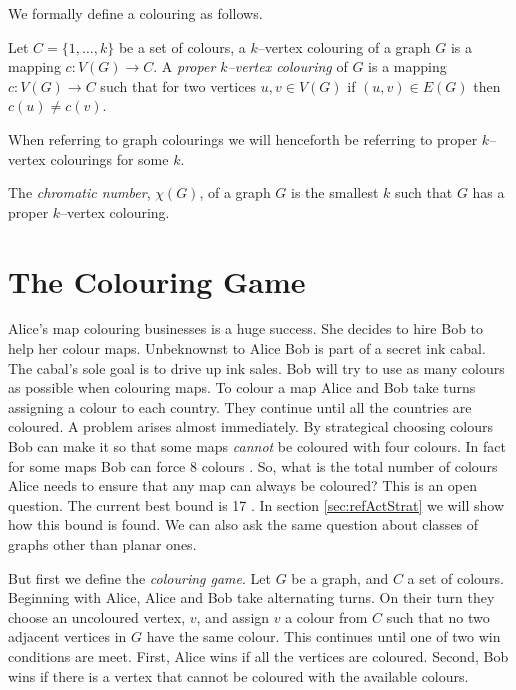 We formally define a colouring as follows.
\begin{definition}
Let $C=\{1,\dots,k\}$ be a set of colours, a $k$--vertex colouring of a graph $G$ is a mapping $c\colon V(G) \to C$. A \textit{proper $k$--vertex colouring} of $G$ is a mapping $c\colon V(G) \to C$ such that for two vertices $u,v\in V(G)$ if $(u,v)\in E(G)$ then $c(u)\neq c(v)$. 
\end{definition}
When referring to graph colourings we will henceforth be referring to proper $k$--vertex colourings for some $k$. 
\begin{definition}
The \textit{chromatic number}, $\chi(G)$, of a graph $G$ is the smallest $k$ such that $G$ has a proper $k$--vertex colouring.
\end{definition} 

\section{The Colouring Game} \label{sec:colouring_game}
Alice's map colouring businesses is a huge success. She decides to hire Bob to help her colour maps. Unbeknownst to Alice Bob is part of a secret ink cabal. The cabal's sole goal is to drive up ink sales. Bob will try to use as many colours as possible when colouring maps. To colour a map Alice and Bob take turns assigning a colour to each country. They continue until all the countries are coloured. A problem arises almost immediately. By strategical choosing colours Bob can make it so that some maps \textit{cannot} be coloured with four colours. In fact for some maps Bob can force 8 colours \cite{kierstead1994planar}. So, what is the total number of colours Alice needs to ensure that any map can always be coloured? This is an open question. The current best bound is 17 \cite{Zhu2008}. In section \ref{sec:refActStrat} we will show how this bound is found. We can also ask the same question about classes of graphs other than planar ones. 

But first we define the \textit{colouring game}. Let $G$ be a graph, and $C$ a set of colours. Beginning with Alice, Alice and Bob take alternating turns. On their turn they choose an uncoloured vertex, $v$, and assign $v$ a colour from $C$ such that no two adjacent vertices in $G$ have the same colour. This continues until one of two win conditions are meet. First, Alice wins if all the vertices are coloured. Second, Bob wins if there is a vertex that cannot be coloured with the available colours.

